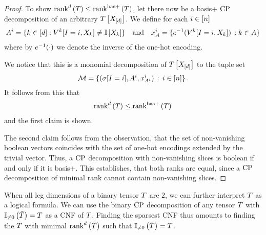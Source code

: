 \begin{proof}
    To show $\mathrm{rank}^{d}\left(T\right) \leq \mathrm{rank}^{\mathrm{bas+}}\left(T\right)$, let there now be a basis+ $\mathrm{CP}$ decomposition of an arbitrary $T\left[X_{[d]}\right]$.
    We define for each $i\in[n]$
    \begin{align*}
        A^{i} = \{k\in[d] : V^{k}[I=i, X_{k}] \neq \mathbb{I}\left[X_{k}\right] \}
        \quad \text{and} \quad
        x_{A}^{i} = \{e^{-1}(V^{k}[I=i, X_{k}] ) \, : k\in A\}
    \end{align*}
    where by $e^{-1}(\cdot)$ we denote the inverse of the one-hot encoding.

    We notice that this is a monomial decomposition of $T\left[X_{[d]}\right]$ to the tuple set
    \begin{align*}
        \mathcal{M} = \{(\sigma[I=i], A^{i}, x_{A^{i}}^{i} ) \, : \, i\in[n] \} \, .
    \end{align*}
    It follows from this that
    \begin{align*}
        \mathrm{rank}^{d}\left(T\right) \leq \mathrm{rank}^{\mathrm{bas+}}\left(T\right) \,
    \end{align*}
    and the first claim is shown.

    The second claim follows from the observation, that the set of non-vanishing boolean vectors coincides with the set of one-hot encodings extended by the trivial vector.
    Thus, a $\mathrm{CP}$ decomposition with non-vanishing slices is boolean if and only if it is basis+.
    This establishes, that both ranks are equal, since a $\mathrm{CP}$ decomposition of minimal rank cannot contain non-vanishing slices.
\end{proof}

\begin{remark}
    When all leg dimensions of a binary tensor $T$ are $2$, we can further interpret $T$ as a logical formula.
    We can use the binary $\mathrm{CP}$ decomposition of any tensor $\tilde{T}$ with $\mathbb{I}_{\neq0}\left(\tilde{T}\right)=T$ as a CNF of $T$.
    Finding the sparsest CNF thus amounts to finding the $\tilde{T}$ with minimal $\mathrm{rank}^{d}\left(\tilde{T}\right)$ such that $\mathbb{I}_{\neq0}\left(\tilde{T}\right)=T$.
\end{remark}

